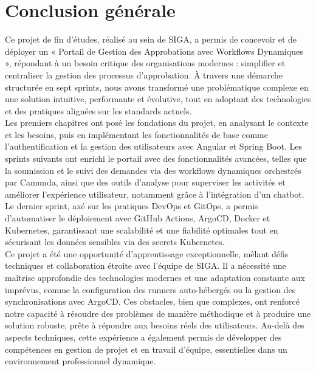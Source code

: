 \chapter*{Conclusion générale}

Ce projet de fin d’études, réalisé au sein de SIGA, a permis de concevoir et de déployer un « Portail de Gestion des Approbations avec Workflows Dynamiques », répondant à un besoin critique des organisations modernes : simplifier et centraliser la gestion des processus d’approbation. À travers une démarche structurée en sept sprints, nous avons transformé une problématique complexe en une solution intuitive, performante et évolutive, tout en adoptant des technologies et des pratiques alignées sur les standards actuels. \\

Les premiers chapitres ont posé les fondations du projet, en analysant le contexte et les besoins, puis en implémentant les fonctionnalités de base comme l’authentification et la gestion des utilisateurs avec Angular et Spring Boot. Les sprints suivants ont enrichi le portail avec des fonctionnalités avancées, telles que la soumission et le suivi des demandes via des workflows dynamiques orchestrés par Camunda, ainsi que des outils d’analyse pour superviser les activités et améliorer l’expérience utilisateur, notamment grâce à l’intégration d’un chatbot. Le dernier sprint, axé sur les pratiques DevOps et GitOps, a permis d’automatiser le déploiement avec GitHub Actions, ArgoCD, Docker et Kubernetes, garantissant une scalabilité et une fiabilité optimales tout en sécurisant les données sensibles via des secrets Kubernetes. \\

Ce projet a été une opportunité d’apprentissage exceptionnelle, mêlant défis techniques et collaboration étroite avec l’équipe de SIGA. Il a nécessité une maîtrise approfondie des technologies modernes et une adaptation constante aux imprévus, comme la configuration des runners auto-hébergés ou la gestion des synchronisations avec ArgoCD. Ces obstacles, bien que complexes, ont renforcé notre capacité à résoudre des problèmes de manière méthodique et à produire une solution robuste, prête à répondre aux besoins réels des utilisateurs. Au-delà des aspects techniques, cette expérience a également permis de développer des compétences en gestion de projet et en travail d’équipe, essentielles dans un environnement professionnel dynamique. \\

